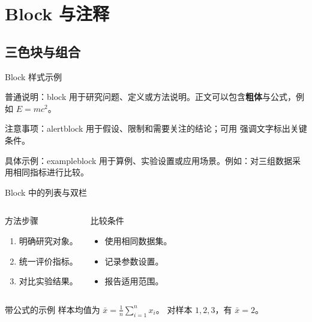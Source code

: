 \section{Block 与注释}
\subsection{三色块与组合}
\begin{frame}{Block 样式示例}
  \begin{block}{普通说明：block}
    用于研究问题、定义或方法说明。正文可以包含\textbf{粗体}与公式，例如 $E=mc^2$。
  \end{block}

  \begin{alertblock}{注意事项：alertblock}
    用于假设、限制和需要关注的结论；可用 \alert{强调文字}标出关键条件。
  \end{alertblock}

  \begin{exampleblock}{具体示例：exampleblock}
    用于算例、实验设置或应用场景。例如：对三组数据采用相同指标进行比较。
  \end{exampleblock}
\end{frame}

\begin{frame}{Block 中的列表与双栏}
  \begin{columns}[T,onlytextwidth]
    \begin{block}{方法步骤}
      \begin{enumerate}
        \item 明确研究对象。
        \item 统一评价指标。
        \item 对比实验结果。
      \end{enumerate}
    \end{block}

    \begin{alertblock}{比较条件}
      \begin{itemize}
        \item 使用相同数据集。
        \item 记录参数设置。
        \item 报告适用范围。
      \end{itemize}
    \end{alertblock}
  \end{columns}

  \begin{exampleblock}{带公式的示例}
    样本均值为 $\bar{x}=\frac{1}{n}\sum_{i=1}^{n}x_i$。
    对样本 $1,2,3$，有 $\bar{x}=2$。
  \end{exampleblock}
\end{frame}

